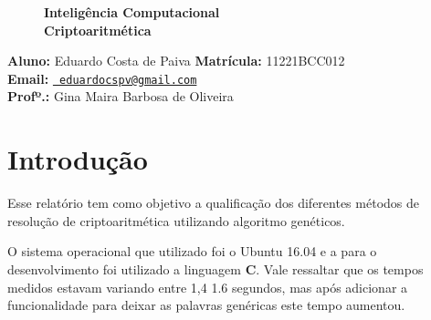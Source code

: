 \documentclass[hidelinks,12pt]{article}
\newcommand{\bigicon}[1]{\texttt{[image: \#1]}}
\begin{document}
\pagestyle{fancy}


\lhead{\bigicon{Figures/ufu}}
\rhead{\bigicon{Figures/facom}}
\lfoot{}
\cfoot{}
\rfoot{}
\vspace*{8.5cm}
\begin{figure}[!h]
	\centering
	\Huge{\bf {Inteligência Computacional\\ Criptoaritmética}}
\end{figure}

\vspace*{6cm}

\noindent\textbf{Aluno:} Eduardo Costa de Paiva \qquad \textbf{Matrícula:} 11221BCC012 \\
\textbf{Email:} \texttt{\small \url{ eduardocspv@gmail.com}}\\
\textbf{Profº.:} Gina Maira Barbosa de Oliveira


\newpage
\fancyhead[C]{}
\fancyhead[R]{}
\fancyhead[L]{\leftmark}
\fancyfoot{}
\fancyfoot[C]{\hspace{1.5cm}\thepage}


{\let\thefootnote\relax{}}

\newpage

\tableofcontents


\newpage

\section{Introdução}

	Esse relatório tem como objetivo a qualificação dos diferentes métodos de resolução de criptoaritmética utilizando algoritmo genéticos.  
	
	O sistema operacional que utilizado foi o Ubuntu 16.04 e a para o desenvolvimento foi utilizado a linguagem {\bf{C}}. Vale ressaltar que os tempos medidos estavam variando entre 1,4 1.6 segundos, mas após adicionar a funcionalidade para deixar as palavras genéricas este tempo aumentou.
	
\end{document}
